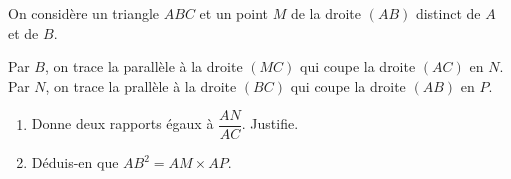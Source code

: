 
On considère un triangle $ABC$ et un point $M$ de la droite $(AB)$
distinct de $A$ et de $B$.
\par Par $B$, on trace la parallèle à la droite $(MC)$ qui coupe la
droite $(AC)$ en $N$. Par $N$, on trace la prallèle à la droite $(BC)$
qui coupe la droite $(AB)$ en $P$.
\begin{enumerate}
  \item Donne deux rapports égaux à $\dfrac{AN}{AC}$. Justifie.
  \item Déduis-en que $AB^2=AM\times AP$.
\end{enumerate}